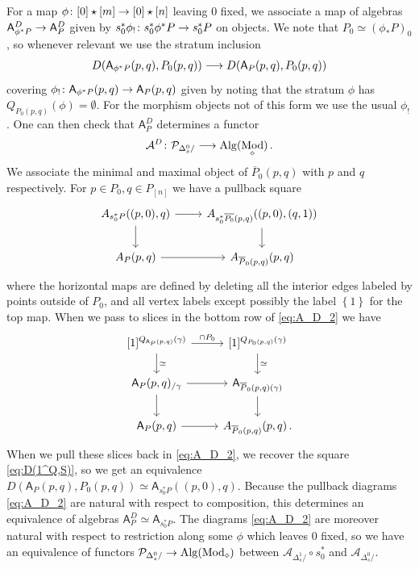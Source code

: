 \documentclass[10pt]{amsart}
\numberwithin{equation}{section}
\theoremstyle{definition}
\DeclareMathOperator{\Mod}{Mod}
\newcommand{\Alg}{\mathrm{Alg}\vphantom{z}}
\newcommand{\cA}{\mathcal{A}}
\newcommand{\cP}{\mathcal{P}}
\newcommand{\sfA}{\mathsf{A}}
\newcommand{\join}{\star}
\renewcommand{\to}{\mathchoice{\longrightarrow}{\rightarrow}{}{}}
\begin{document}
For a map $\phi \colon [0]\join [m] \to [0]\join [n]$ leaving 0 fixed, we associate a map of algebras $\sfA^{D}_{\phi^{*}P} \to \sfA^{D}_{P}$ given by $s_{0}^{*}\phi_{!}\colon s_{0}^{*}\phi^{*}P \to s_{0}^{*}P$ on objects.
We note that $P_0 \simeq (\phi_{*}P)_{0}$, so whenever relevant we use the stratum inclusion
\begin{align*}
	D(\sfA_{\phi^{*}P }(p,q), P_{0}(p,q) ) \to D(\sfA_{P}(p,q), P_{0}(p,q) )
\end{align*}
covering $\phi_{!}\colon \sfA_{\phi^{*}P}(p,q) \to \sfA_{P}(p,q)$ given by noting that the stratum $\phi$ has $Q_{P_{0}(p,q)}(\phi)=\emptyset$.
For the morphism objects not of this form we use the usual $\phi_{!}$.
One can then check that $\sfA_{P}^{D}$ determines a functor
\begin{align*}
	\cA^{D} \colon \cP_{\Delta^{0}_{s}/} \to \Alg(\Mod_{\diamond})\,.
\end{align*}
We associate the minimal and maximal object of $\overline{P}_{0}(p,q)$ with $p$ and $q$ respectively.
For $p\in P_{0}, q\in P_{[n]}$ we have a pullback square
\begin{equation}\label{eq:A_D_2}
	\begin{tikzcd}
		A_{s_{0}^{*}P}( (p,0), q) \arrow[r] \arrow[d]      &   A_{s_{0}^{*}\overline{P_{0}}(p,q)}( (p,0), (q,1) )  \arrow[d] \\
		A_{P}(p,q)  \arrow[r]               &   A_{\overline{P}_{0}(p,q)}(p,q)
	\end{tikzcd}
\end{equation}
where the horizontal maps are defined by deleting all the interior edges labeled by points outside of $P_{0}$, and all vertex labels except possibly the label $\left\{ 1\right\}$ for the top map.
When we pass to slices in the bottom row of \eqref{eq:A_D_2} we have
\begin{equation*}
	\begin{tikzcd}
		{[1]^{Q_{\sfA_{P}(p,q)}(\gamma)} } \arrow[r, "\cap P_{0}"]  \arrow[d, "\simeq"] &  { [1]^{Q_{P_{0}(p,q)}(\gamma) } } \arrow[d, "\simeq"] \\
		\sfA_{P}(p,q)_{/\gamma} \arrow[r] \arrow[d]      &   \sfA_{\overline{P}_{0}(p,q)(\gamma)}  \arrow[d] \\
		\sfA_{P}(p,q)  \arrow[r]               &   A_{\overline{P}_{0}(p,q)}(p,q) \,.
	\end{tikzcd}
\end{equation*}
When we pull these slices back in \eqref{eq:A_D_2}, we recover the square \eqref{eq:D(1^Q,S)}, so we get an equivalence $D(\sfA_{P}(p,q), P_{0}(p,q)) \simeq \sfA_{s_{0}^{*}P}( (p,0),q )$.
Because the pullback diagrams \eqref{eq:A_D_2} are natural with respect to composition, this determines an equivalence of algebras $\sfA_{P}^{D}\simeq \sfA_{s_{0}^{*}P}$.
The diagrams \eqref{eq:A_D_2} are moreover natural with respect to restriction along some $\phi$ which leaves $0$ fixed, so we have an equivalence of functors $\cP_{\Delta^{0}_{s}/}  \to \Alg(\Mod_{\diamond})$ between $\cA_{\Delta^{1}_{s}/} \circ s_{0}^{*}$ and  $\cA_{\Delta^{0}_{s}/}$.
\end{document}
